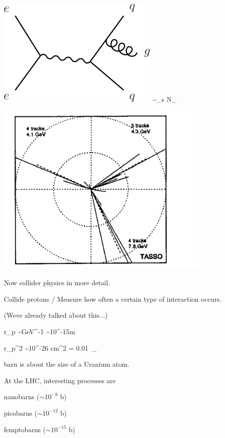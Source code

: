 {\begin{minipage}{0.5\textwidth}
\bc
\includegraphics[width=0.6\textwidth]{./eeToqqg.pdf}
\ec
\be
{} \sim \alpha_s N_{}
\ee
\end{minipage} \hfill
\begin{minipage}{0.5\textwidth}
\bc
\includegraphics[width=0.8\textwidth]{./Tasso-3jet.png}
\ec
\end{minipage} \hfill

\clearpage 

Now collider physics in more detail.

Collide protons /  Measure how often a certain type of interaction occurs.

(Weve already talked about this...)

\be
r_p \sim GeV^{-1} \sim 10^{-15}m 
\ee


\be
r_p^2 \sim 10^{-26} cm^2 = 0.01\ _{}
\ee

barn is about the size of a Uranium atom.

At the LHC, interesting processes are
\bi
\item[-] nanobarns ($\sim 10^{-9}$ b)
\item[-] picobarns ($\sim 10^{-12}$ b)
\item[-] femptobarns ($\sim 10^{-15}$ b)
\ei 

}
